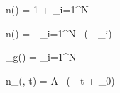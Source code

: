 n() = 1 + \sum_{i=1}^N 

\nabla n() = - \sum_{i=1}^N  \, ( - _i)

_g() = \sum_{i=1}^N 

\delta n_{}(, t) = A \, \sin( \cdot {} - \omega t + \phi_0)

